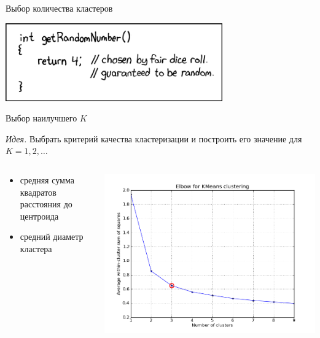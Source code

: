 \documentclass[aspectratio=169]{beamer}
\begin{document}
\begin{frame}

\begin{center}
{\Large Выбор количества кластеров}

\vspace{2em}
\includegraphics[width=0.7\textwidth]{images/random_number.png}
\end{center}

\end{frame}

\begin{frame}{Выбор наилучшего $K$}

{\it Идея.} Выбрать критерий качества кластеризации и построить его значение для $K = 1, 2, \ldots$

\begin{columns}[]
    \begin{column}{.5\textwidth}
    \begin{itemize}
	\item средняя сумма квадратов расстояния до центроида
	\item средний диаметр кластера
	\end{itemize}
    \end{column}
    \begin{column}{.5\textwidth}
    \vspace{1em}
    \includegraphics[scale=0.3]{images/elbow.png}
    \end{column}
\end{columns}

\end{frame}
\end{document}
